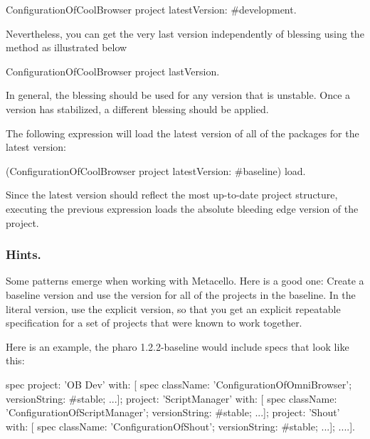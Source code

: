 \documentclass[a4paper,10pt,twoside]{book}
\begin{document}
\begin{code}{}
ConfigurationOfCoolBrowser project latestVersion: #development.
\end{code}

Nevertheless, you can get the very last version independently of blessing using the  method as illustrated below

\begin{code}{}
ConfigurationOfCoolBrowser project lastVersion.
\end{code}

In general, the  blessing should be used for any version that is unstable. Once a version has stabilized, a different blessing should be applied.

The following expression will load the latest version of all of the packages for the latest  version:
 \begin{code}{}
(ConfigurationOfCoolBrowser project latestVersion: #baseline) load.
\end{code}

Since the latest  version should reflect the most up-to-date project structure, executing the previous expression loads the absolute bleeding edge version of the project. 


\subsubsection{Hints.}
Some patterns emerge when working with Metacello. Here is a good one: 
Create a baseline version and use the  version for all of the projects in the baseline. In the literal version, use the explicit version, so that you get an explicit repeatable specification for a set of projects that were known to work together.

Here is an example, the pharo 1.2.2-baseline would include specs that look like this:

\begin{code}{}
 spec
    project: 'OB Dev' with: [
      spec
         className: 'ConfigurationOfOmniBrowser';
         versionString: #stable;
         ...];
    project: 'ScriptManager' with: [
      spec
         className: 'ConfigurationOfScriptManager';
         versionString: #stable;
         ...];
    project: 'Shout' with: [
      spec
         className: 'ConfigurationOfShout';
         versionString: #stable;
         ...];
    ....].
    
 \end{code}
\end{document}

